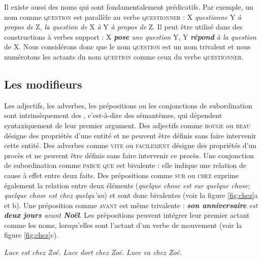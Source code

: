 Il existe aussi des noms qui sont fondamentalement prédicatifs. Par exemple, un nom comme \textsc{question} est parallèle au verbe \textsc{questionner} : X \textit{questionne} Y \textit{à propos de} Z, \textit{la question de} X \textit{à} Y \textit{à propos de} Z. Il peut être utilisé dans des constructions à verbes support : X \textit{\textbf{pose} une question} Y, Y \textit{\textbf{répond} à la question} de X. Nous considérons donc que le nom \textsc{question} est un nom trivalent et nous numérotons les actants du nom \textsc{question} comme ceux du verbe \textsc{questionner}.

\subsection{Les modifieurs} 
Les adjectifs, les adverbes, les prépositions ou les conjonctions de subordination sont intrinsèquement des , c’est-à-dire des sémantèmes, qui dépendent syntaxiquement de leur premier argument. Des adjectifs comme \textsc{rouge} ou \textsc{beau} désigne des propriétés d’une entité et ne peuvent être définis sans faire intervenir cette entité. Des adverbes comme \textsc{vite} ou \textsc{facilement} désigne des propriétés d’un procès et ne peuvent être définis sans faire intervenir ce procès. Une conjonction de subordination comme \textsc{parce que} est bivalente : elle indique une relation de cause à effet entre deux faits. Des prépositions comme \textsc{sur} ou \textsc{chez} exprime également la relation entre deux éléments (\textit{quelque chose est sur quelque chose}; \textit{quelque chose est chez quelqu’un}) et sont donc bivalentes (voir la figure \ref{fig:chez}a et b). Une préposition comme \textsc{avant} est même trivalente : \textit{\textbf{son anniversaire} est \textbf{deux jours} avant \textbf{Noël}}. Les prépositions peuvent intégrer leur premier actant comme les noms, lorsqu’elles sont l’actant d’un verbe de mouvement (voir la figure \ref{fig:chez}c).

\ea\label{ex:chez} 
\ea \textit{Luce est chez Zoé.}
\ex \textit{Luce dort chez Zoé.}
\ex \textit{Luce va chez Zoé.}\z\z

